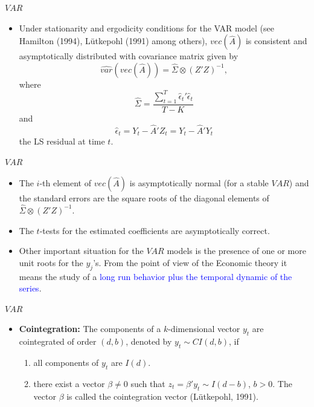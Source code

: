 \documentclass{beamer}
\newcommand{\?}{?`}
\begin{document}
\begin{frame}{$VAR$}
  \begin{itemize}
  \item     Under stationarity and ergodicity conditions  for the VAR model (see Hamilton (1994), L\"{u}tkepohl (1991) among others),
  $vec(\hat{A})$ is consistent and asymptotically distributed with covariance matrix given by
    \begin{displaymath}
      \widehat{var}\left(vec(\hat{A})\right)=\hat{\Sigma} \otimes
      (Z'Z)^{-1},
    \end{displaymath}
    where
    \begin{displaymath}
      \hat{\Sigma}=\frac{\sum_{t=1}^T\hat{\epsilon}_t'\hat{\epsilon}_t}{T-K}
    \end{displaymath}
    and
    \begin{displaymath}
      \hat{\epsilon}_t=Y_t-\hat{A}'Z_t=Y_t-\hat{A}'Y_t
    \end{displaymath}
    the LS residual at time $t$.
  \end{itemize}
\end{frame}

\begin{frame}{$VAR$}
  \begin{itemize}
  \item The $i$-th element of $vec(\hat{A})$ is asymptotically normal (for a stable $VAR$)
  and the standard errors are the square roots of the diagonal elements of  $\hat{\Sigma}
    \otimes (Z'Z)^{-1}$.
    \item  The $t$-tests for the estimated coefficients are asymptotically correct.
    \item Other important situation for the $VAR$ models is the presence of one or more unit roots for the $y_j$'s.
    From the point of view of the Economic theory it means the study of a \textcolor{blue}{long run behavior plus the temporal dynamic of the series}.
      \end{itemize}
\end{frame}

\begin{frame}{$VAR$}
    \begin{itemize}
  \item \textbf{Cointegration: } The components of a $k$-dimensional vector  $y_t$ are cointegrated of order  $(d,b)$,
  denoted by  $y_t\sim CI(d,b)$,  if
  \bigskip
    \begin{enumerate}
    \item all components of $y_t$ are $I(d)$.
    \bigskip
    \item there exist a vector $\beta\neq 0$ such that  $z_t=\beta'y_t\sim
      I(d-b)$, $b>0$. The vector $\beta$ is called the cointegration vector
      (L\"{u}tkepohl, 1991).
          \end{enumerate}
  \end{itemize}
\end{frame}
\end{document}
